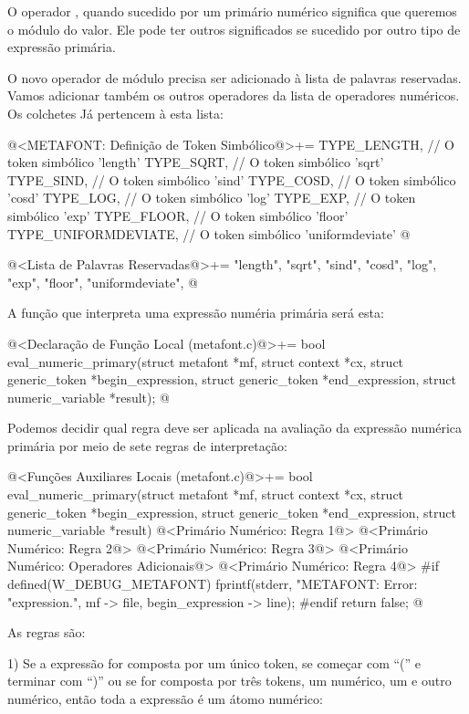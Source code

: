 O operador , quando sucedido por um primário
numérico significa que queremos o módulo do valor. Ele pode ter outros
significados se sucedido por outro tipo de expressão primária.

O novo operador de módulo precisa ser adicionado à lista de palavras
reservadas. Vamos adicionar também os outros operadores da lista de
operadores numéricos. Os colchetes Já pertencem à esta lista:

\iniciocodigo
@<METAFONT: Definição de Token Simbólico@>+=
TYPE_LENGTH,         // O token simbólico 'length'
TYPE_SQRT,           // O token simbólico 'sqrt'
TYPE_SIND,           // O token simbólico 'sind'
TYPE_COSD,           // O token simbólico 'cosd'
TYPE_LOG,            // O token simbólico 'log'
TYPE_EXP,            // O token simbólico 'exp'
TYPE_FLOOR,          // O token simbólico 'floor'
TYPE_UNIFORMDEVIATE, // O token simbólico 'uniformdeviate'
@
\fimcodigo

\iniciocodigo
@<Lista de Palavras Reservadas@>+=
"length", "sqrt", "sind", "cosd", "log", "exp", "floor", "uniformdeviate",
@
\fimcodigo

A função que interpreta uma expressão numéria primária será esta:

\iniciocodigo
@<Declaração de Função Local (metafont.c)@>+=
bool eval_numeric_primary(struct metafont *mf, struct context *cx,
                          struct generic_token *begin_expression,
                          struct generic_token *end_expression,
                          struct numeric_variable *result);
@
\fimcodigo

Podemos decidir qual regra deve ser aplicada na avaliação da expressão
numérica primária por meio de sete regras de interpretação:

\iniciocodigo
@<Funções Auxiliares Locais (metafont.c)@>+=
bool eval_numeric_primary(struct metafont *mf, struct context *cx,
                          struct generic_token *begin_expression,
                          struct generic_token *end_expression,
                          struct numeric_variable *result){
  @<Primário Numérico: Regra 1@>
  @<Primário Numérico: Regra 2@>
  @<Primário Numérico: Regra 3@>
  @<Primário Numérico: Operadores Adicionais@>
  @<Primário Numérico: Regra 4@>
#if defined(W_DEBUG_METAFONT)
  fprintf(stderr, "METAFONT: Error: %
          "expression.\n",  mf -> file, begin_expression -> line);
#endif
  return false;
}
@

As regras são:

1) Se a expressão for composta por um único token, se começar com
``('' e terminar com ``)'' ou se for composta por três tokens, um
numérico, um \monoespaco{/} e outro numérico, então toda a expressão é
um átomo numérico:

